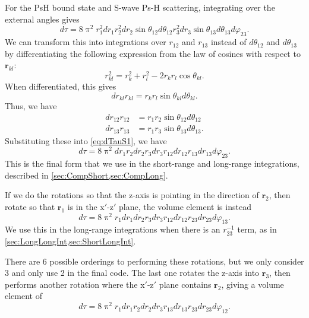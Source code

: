 \documentclass[Dissertation.tex]{subfiles}
\begin{document}
For the PsH bound state and S-wave Ps-H scattering, integrating over the
external angles gives
\begin{equation}
\label{eq:dTauS1}
d\tau = 8 \uppi^2 r_1^2 dr_1 r_2^2 dr_2 \sin\theta_{12} d\theta_{12} r_3^2 dr_3
  \sin\theta_{13} d\theta_{13} d\varphi_{23}.
\end{equation}
We can transform this into integrations over $r_{12}$ and $r_{13}$ instead of
$d\theta_{12}$ and $d\theta_{13}$ by differentiating the following expression
from the law of cosines with respect to $\textbf{r}_{kl}$:
\begin{equation}
\label{eq:rkl}
r_{kl}^2 = r_k^2 + r_l^2 - 2 r_k r_l \cos\theta_{kl}.
\end{equation}
When differentiated, this gives
\begin{equation}
\label{eq:rklDer}
dr_{kl} r_{kl} = r_k r_l \sin\theta_{kl} d\theta_{kl}.
\end{equation}
Thus, we have
\begin{subequations}
\label{eq:rklDer}
\begin{align}
dr_{12} r_{12} &= r_1 r_2 \sin\theta_{12} d\theta_{12} \\
dr_{13} r_{13} &= r_1 r_3 \sin\theta_{13} d\theta_{13}.
\end{align}
\end{subequations}
Substituting these into \cref{eq:dTauS1}, we have
\begin{equation}
\label{eq:dTauS23}
d\tau = 8 \uppi^2 dr_1 r_2 dr_2 r_3 dr_3 r_{12} dr_{12} r_{13} dr_{13}
   d\varphi_{23}.
\end{equation}
This is the final form that we use in the short-range and long-range
integrations, described in \cref{sec:CompShort,sec:CompLong}.

If we do the rotations so that the z-axis is pointing in the direction of
$\textbf{r}_2$, then rotate so that $\textbf{r}_1$ is in the x$'$-z$'$ plane,
the volume element is instead
\begin{equation}
\label{eq:dTauS13}
d\tau = 8 \uppi^2 r_1 dr_1 dr_2 r_3 dr_3 r_{12} dr_{12} r_{23} dr_{23}
   d\varphi_{13}.
\end{equation}
We use this in the long-range integrations when there is an $r_{23}^{-1}$ term,
as in \cref{sec:LongLongInt,sec:ShortLongInt}.

There are 6 possible orderings to performing these rotations, but we only
consider 3 and only use 2 in the final code. The last one rotates the z-axis
into $\textbf{r}_3$, then performs another rotation where the x$'$-z$'$ plane
contains $\textbf{r}_2$, giving a volume element of
\begin{equation}
\label{eq:dTauS12}
d\tau = 8 \uppi^2 r_1 dr_1 r_2 dr_2 dr_3 r_{13} dr_{13} r_{23} dr_{23}
   d\varphi_{12}.
\end{equation}
\end{document}
